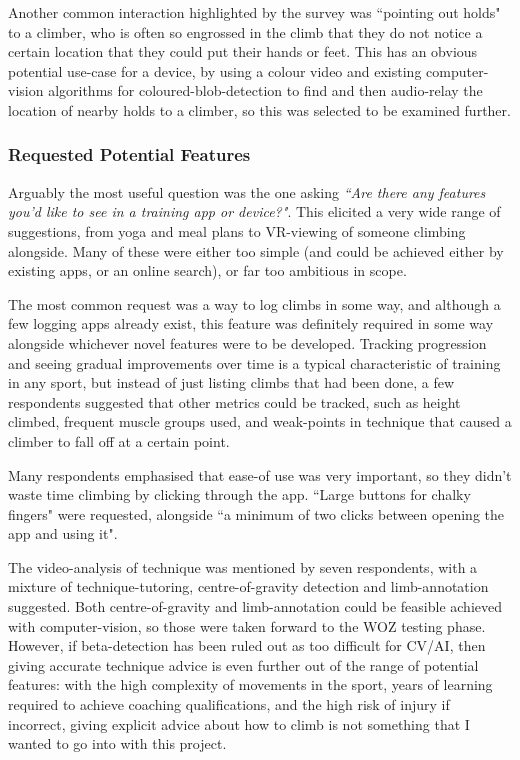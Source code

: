 Another common interaction highlighted by the survey was ``pointing out holds" to a climber, who is often so engrossed in the climb that they do not notice a certain location that they could put their hands or feet.
This has an obvious potential use-case for a device, by using a colour video and existing computer-vision algorithms for coloured-blob-detection to find and then audio-relay the location of nearby holds to a climber, so this was selected to be examined further.



\subsubsection{Requested Potential Features}
Arguably the most useful question was the one asking
\textit{``Are there any features you'd like to see in a training app or device?"}.
This elicited a very wide range of suggestions, from yoga and meal plans to VR-viewing of someone climbing alongside.
Many of these were either too simple (and could be achieved either by existing apps, or an online search), or far too ambitious in scope.

The most common request was a way to log climbs in some way, and although a few logging apps already exist, this feature was definitely required in some way alongside whichever novel features were to be developed.
Tracking progression and seeing gradual improvements over time is a typical characteristic of training in any sport, but instead of just listing climbs that had been done, a few respondents suggested that other metrics could be tracked, such as height climbed, frequent muscle groups used, and weak-points in technique that caused a climber to fall off at a certain point.


Many respondents emphasised that ease-of use was very important, so they didn't waste time climbing by clicking through the app. ``Large buttons for chalky fingers" were requested, alongside ``a minimum of two clicks between opening the app and using it".

The video-analysis of technique was mentioned by seven respondents, with a mixture of technique-tutoring, centre-of-gravity detection and limb-annotation suggested.
Both centre-of-gravity and limb-annotation could be feasible achieved with computer-vision, so those were taken forward to the WOZ testing phase.
However, if beta-detection has been ruled out as too difficult for CV/AI, then giving accurate technique advice is even further out of the range of potential features: with the high complexity of movements in the sport, years of learning required to achieve coaching qualifications, and the high risk of injury if incorrect, giving explicit advice about how to climb is not something that I wanted to go into with this project.

